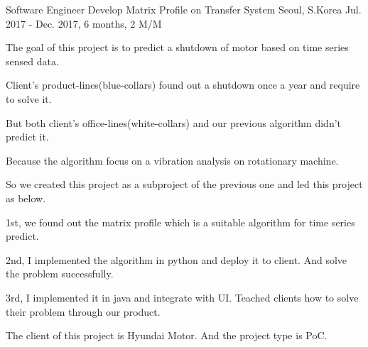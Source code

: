 \begin{cventries}
  \cventry
    {Software Engineer} %
    {Develop Matrix Profile on Transfer System} %
    {Seoul, S.Korea} %
    {Jul. 2017 - Dec. 2017, 6 months, 2 M/M} %
    {
      \begin{cvitems} %
        \item {The goal of this project is to predict a shutdown of motor based on time series sensed data.}
        \item {Client's product-lines(blue-collars) found out a shutdown once a year and require to solve it.}
        \item {But both client's office-lines(white-collars) and our previous algorithm didn't predict it.}
        \item {Because the algorithm focus on a vibration analysis on rotationary machine.}
        \item {So we created this project as a subproject of the previous one and led this project as below.}
        \item {1st, we found out the matrix profile which is a suitable algorithm for time series predict.}
        \item {2nd, I implemented the algorithm in python and deploy it to client. And solve the problem successfully.}
        \item {3rd, I implemented it in java and integrate with UI. Teached clients how to solve their problem through our product.}
        \item {The client of this project is Hyundai Motor. And the project type is PoC.}
      \end{cvitems}
    }


\end{cventries}
